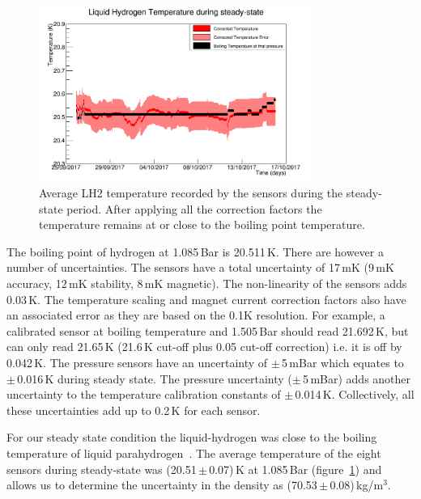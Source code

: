 \begin{figure}[htb!]
  \begin{center}
  \includegraphics[width=0.80\textwidth]{11-Absorber/Figures/SteadyState60mK.png}
  \end{center}
  \caption{Average LH2 temperature recorded by the sensors during the steady-state period. After applying all the correction factors the temperature remains at or close to the boiling point temperature.}
  \label{Fig:TempCalibrated}
\end{figure}
 
The boiling point of hydrogen at 1.085\,Bar is 20.511\,K. There are however a number of uncertainties.
The sensors have a total uncertainty of 17\,mK (9\,mK accuracy, 12\,mK stability, 8\,mK magnetic). The non-linearity of the sensors adds 0.03\,K.
The temperature scaling and magnet current correction factors also have an associated error as they are based on the 0.1K resolution.
For example, a calibrated sensor at boiling temperature and 1.505\,Bar should read 21.692\,K, but can only read 21.65\,K (21.6\,K cut-off plus 0.05 cut-off correction) i.e. it is off by 0.042\,K. The pressure sensors have an uncertainty of $\mathrm{\pm}$\,5\,mBar which equates to $\mathrm{\pm}$\,0.016\,K during steady state.
The pressure uncertainty ($\mathrm{\pm}$\,5\,mBar) adds another uncertainty to the temperature calibration constants of $\mathrm{\pm}$\,0.014\,K. Collectively, all these uncertainties add up to 0.2\,K for each sensor.
 
For our steady state condition the liquid-hydrogen was close to the boiling temperature of liquid parahydrogen~\cite{NOTE524}. The average temperature of the eight sensors during steady-state was (20.51\,$\mathrm{\pm}$\,0.07)\,K at 1.085\,Bar (figure~\ref{Fig:TempCalibrated}) and allows us to determine the uncertainty in the density as (70.53\,$\mathrm{\pm}$\,0.08)\,kg/m$^{3}$.
 

